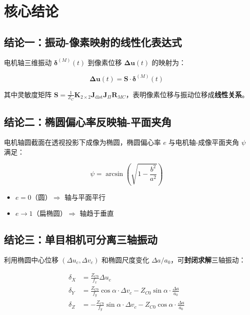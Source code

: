 \documentclass[12pt,a4paper]{article}
\begin{document}
\section{核心结论}

\subsection{结论一：振动-像素映射的线性化表达式}

电机轴三维振动 $\boldsymbol{\delta}^{(M)}(t)$ 到像素位移 $\mathbf{\Delta u}(t)$ 的映射为：

\begin{equation}
\boxed{\mathbf{\Delta u}(t) = \mathbf{S} \cdot \boldsymbol{\delta}^{(M)}(t)}
\label{eq:conclusion_1}
\end{equation}

其中灵敏度矩阵 $\mathbf{S} = \frac{1}{Z_C} \mathbf{K}_{2\times 2} \mathbf{J}_{\text{dist}} \mathbf{J}_{\Pi} \mathbf{R}_{MC}$，表明像素位移与振动位移成\textbf{线性关系}。

\subsection{结论二：椭圆偏心率反映轴-平面夹角}

电机轴圆截面在透视投影下成像为椭圆，椭圆偏心率 $e$ 与电机轴-成像平面夹角 $\psi$ 满足：

\begin{equation}
\boxed{\psi = \arcsin\!\left(\sqrt{1 - \frac{b^2}{a^2}}\right)}
\label{eq:conclusion_2}
\end{equation}

\begin{itemize}
\item $e = 0$（圆）$\Rightarrow$ 轴与平面平行
\item $e \to 1$（扁椭圆）$\Rightarrow$ 轴趋于垂直
\end{itemize}

\subsection{结论三：单目相机可分离三轴振动}

利用椭圆中心位移 $(\Delta u_c, \Delta v_c)$ 和椭圆尺度变化 $\Delta a/a_0$，可\textbf{封闭求解}三轴振动：

\begin{equation}
\boxed{
\begin{aligned}
\delta_X &= \frac{Z_{C0}}{f_x} \Delta u_c \\[6pt]
\delta_Y &= \frac{Z_{C0}}{f_y} \cos\alpha \cdot \Delta v_c - Z_{C0} \sin\alpha \cdot \frac{\Delta a}{a_0} \\[6pt]
\delta_Z &= -\frac{Z_{C0}}{f_y} \sin\alpha \cdot \Delta v_c - Z_{C0} \cos\alpha \cdot \frac{\Delta a}{a_0}
\end{aligned}
}
\label{eq:conclusion_3}
\end{equation}
\end{document}
